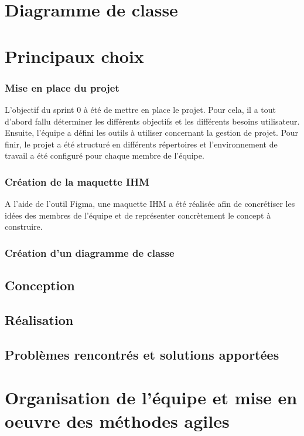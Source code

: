 \documentclass[11pt]{report}
\begin{document}
\chapter{Diagramme de classe}


\chapter{Principaux choix}

\subsection{Mise en place du projet}
L'objectif du sprint 0 à été de mettre en place le projet. Pour cela, il a tout d'abord fallu 
déterminer les différents objectifs et les différents besoins utilisateur. Ensuite, l'équipe a défini
les outils à utiliser concernant la gestion de projet. Pour finir, le projet a été structuré en différents répertoires 
et l'environnement de travail a été configuré pour chaque membre de l'équipe.

\subsection{Création de la maquette IHM}
A l'aide de l'outil Figma, une maquette IHM a été réalisée afin de concrétiser les idées des membres de l'équipe
et de représenter concrètement le concept à construire.

\subsection{Création d'un diagramme de classe}

\section{Conception}

\section{Réalisation}

\section{Problèmes rencontrés et solutions apportées}


\chapter{Organisation de l'équipe et mise en oeuvre des méthodes agiles}
\end{document}
